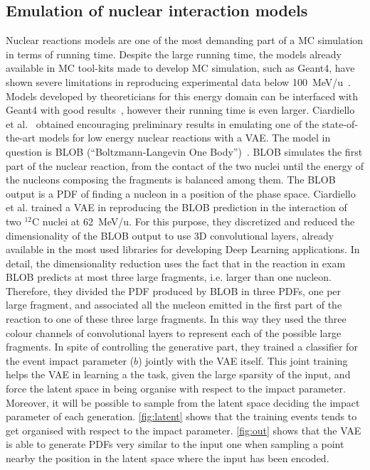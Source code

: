 \subsection{Emulation of nuclear interaction models}
Nuclear reactions models are one of the most demanding part of a MC simulation in terms of running time. Despite the large running time, the models already available in MC tool-kits made to develop MC simulation, such as Geant4, have shown severe limitations in reproducing experimental data below 100~MeV/u~\cite{g4-med}. Models developed by theoreticians for this energy domain can be interfaced with Geant4 with good results~\cite{blob-g4}, however their running time is even larger. Ciardiello et al.~\cite{blob-emulation} obtained encouraging preliminary results 
in emulating one of the state-of-the-art models for low energy nuclear reactions with a VAE. The model in question is BLOB (``Boltzmann-Langevin One Body'')~\cite{blob}. BLOB simulates the first part of the nuclear reaction, from the contact of the two nuclei until the energy of the nucleons composing the fragments is balanced among them. The BLOB output is a PDF of finding a nucleon in a position of the phase space. Ciardiello et al. trained a VAE in reproducing the BLOB prediction in the interaction of two $^{12}$C nuclei at 62~MeV/u. For this purpose, they discretized and reduced the dimensionality of the BLOB output to use 3D convolutional layers, already available in the most used libraries for developing Deep Learning applications. In detail, the dimensionality reduction uses the fact that in the reaction in exam BLOB predicts at most three large fragments, i.e. larger than one nucleon. Therefore, they divided the PDF produced by BLOB in three PDFs, one per large fragment, and associated all the nucleon emitted in the first part of the reaction to one of these three large fragments. In this way they used the three colour channels of convolutional layers to represent each of the possible large fragments. In spite of controlling the generative part, they trained a classifier for the event impact parameter ($b$) jointly with the VAE itself. This joint training helps the VAE in learning a the task, given the large sparsity of the input, and force the latent space in being organise with respect to the impact parameter. Moreover, it will be possible to sample from the latent space deciding the impact parameter of each generation.
\autoref{fig:latent} shows that the training events tends to get organised with respect to the impact parameter. \autoref{fig:out} shows that the VAE is able to generate PDFs very similar to the input one when sampling a point nearby the position in the latent space where the input has been encoded.

